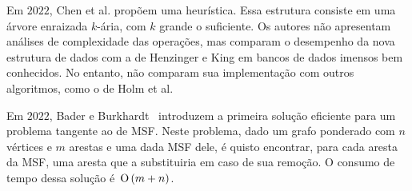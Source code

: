 
Em $2022$, Chen et al. \cite{QC22} propõem uma heurística. Essa estrutura consiste em uma árvore enraizada $k$-ária, com $k$ grande o suficiente. Os autores não apresentam análises de complexidade das operações, mas comparam o desempenho da nova estrutura de dados com a de Henzinger e King em bancos de dados imensos bem conhecidos. No entanto, não comparam sua implementação com outros algoritmos, como o de Holm et al.

Em $2022$, Bader e Burkhardt~\cite{simpleAndEfficient2022} introduzem a primeira solução eficiente para um problema tangente ao de MSF. Neste problema, dado um grafo ponderado com $n$ vértices e $m$ arestas e uma dada MSF dele, é quisto encontrar, para cada aresta da MSF, uma aresta que a substituiria em caso de sua remoção. O consumo de tempo dessa solução é~$\text{O}\left(m+n\right)$.
